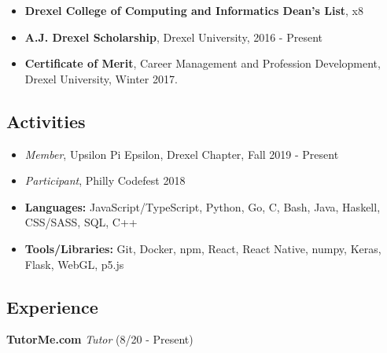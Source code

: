 \documentclass[10pt]{article}
\begin{document}
\begin{multicols}{2}
    \vspace{-\topsep}
    \begin{itemize}[leftmargin=*,noitemsep,topsep=0pt]
        \item \textbf{Drexel College of Computing and
            Informatics Dean's List}, x8
        \item \textbf{A.J. Drexel Scholarship}, Drexel University,
            2016 - Present
        \item \textbf{Certificate of Merit}, Career Management and
            Profession Development, Drexel University, Winter 2017.
    \end{itemize}

    \vspace{-\topsep}
    \subsection*{Activities}%
    \label{sub:Activities}

    \vspace{-\topsep}
    \begin{itemize}[leftmargin=*,noitemsep,topsep=0pt]
        \item \emph{Member}, Upsilon Pi Epsilon, Drexel Chapter,
            Fall 2019 - Present
        \item \emph{Participant}, Philly Codefest 2018
    \end{itemize}

    \vfill\null
\end{multicols}

\vspace{-2.5em}
\begin{itemize}[leftmargin=*,noitemsep,topsep=0pt]
    \item \textbf{Languages:} JavaScript/TypeScript, Python, Go, C,
        Bash, Java, Haskell, CSS/SASS, SQL, C++
    \item \textbf{Tools/Libraries:} Git, Docker, npm, React,
        React Native, numpy, Keras, Flask, WebGL, p5.js
\end{itemize}

\vspace{-1.5em}
\subsection*{Experience}%
\label{sub:Experience}

\vspace{-0.5em}
\textbf{TutorMe.com}
\emph{Tutor}
(8/20 - Present)
\end{document}
